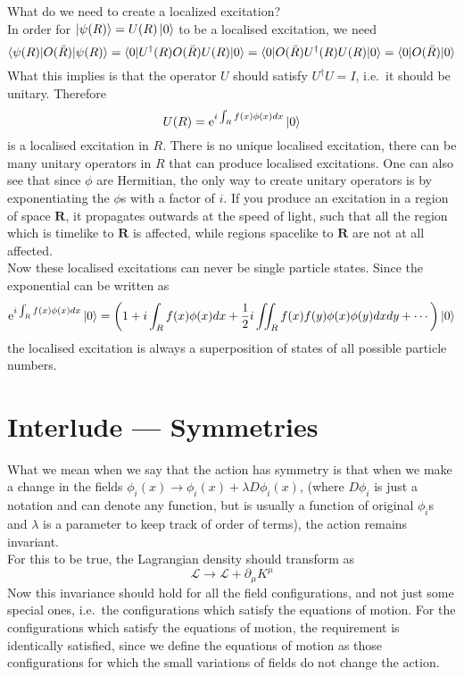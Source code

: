 \documentclass[11pt]{article}
\newcommand{\del}{\partial}
\newcommand{\e}{\mathrm{e}}
\newcommand{\ld}{\mathcal{L}}
\numberwithin{equation}{section}
\begin{document}
    What do we need to create a localized excitation?\\
    In order for \(\ket{\psi(R)} = U(R)\ket{0}\) to be a localised excitation, we need 
    \begin{equation*}
        \braket{\psi(R)|O(\bar{R})|\psi(R)} = \braket{0|U^\dagger(R)O(\bar{R})U(R)|0} = \braket{0|O(\bar{R})U^\dagger(R)U(R)|0} = \braket{0|O(\bar{R})|0}
    \end{equation*}
    What this implies is that the operator \(U\) should satisfy \(U^\dagger U = I\), i.e.\ it should be unitary. Therefore 
    \begin{equation*}
        U(R) = \e^{i\int_R f(x)\phi(x) dx}\ket{0}
    \end{equation*}
    is a localised excitation in \(R\). There is no unique localised excitation, there can be many unitary operators in \(R\) that can produce localised excitations. One can also see that since \(\phi\) are Hermitian, the only way to create unitary operators is by exponentiating the \(\phi\)s with a factor of \(i\). If you produce an excitation in a region of space \(\textbf{R}\), it propagates outwards at the speed of light, such that all the region which is timelike to \(\textbf{R}\) is affected, while regions spacelike to \(\textbf{R}\) are not at all affected. \\
    
    Now these localised excitations can never be single particle states. Since the exponential can be written as 
    \begin{equation*}
        \e^{i\int_R f(x)\phi(x) dx}\ket{0} = \left(1 + i\int_R f(x)\phi(x) dx + \frac{1}{2}i\iint_R f(x)f(y)\phi(x)\phi(y) dxdy + \cdots \right)\ket{0}
    \end{equation*}
    the localised excitation is always a superposition of states of all possible particle numbers. 

    \newpage
    \section{Interlude — Symmetries}

    What we mean when we say that the action has symmetry is that when we make a change in the fields \(\phi_i(x) \to \phi_i(x) + \lambda D\phi_i(x)\), (where \(D\phi_i\) is just a notation and can denote any function, but is usually a function of original \(\phi_i\)s and \(\lambda\) is a parameter to keep track of order of terms), the action remains invariant. \\
    For this to be true, the Lagrangian density should transform as 
    \begin{equation*}
        \ld \to \ld + \del_\mu K^\mu
    \end{equation*}
    Now this invariance should hold for all the field configurations, and not just some special ones, i.e.\ the configurations which satisfy the equations of motion. For the configurations which satisfy the equations of motion, the requirement is identically satisfied, since we define the equations of motion as those configurations for which the small variations of fields do not change the action.\\ 
\end{document}
